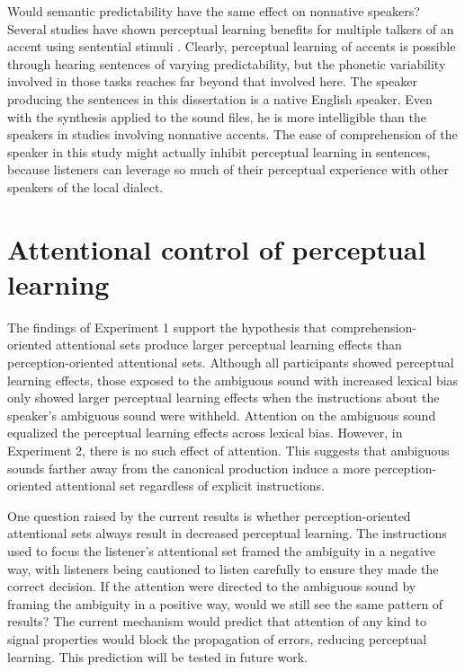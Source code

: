 Would semantic predictability have the same effect on nonnative speakers?
Several studies have shown perceptual learning benefits for multiple talkers of an accent using sentential stimuli \citep[and others]{Bradlow2008}.  
Clearly, perceptual learning of accents is possible through hearing sentences of varying predictability, but the phonetic variability involved in those tasks reaches far beyond that involved here.  
The speaker producing the sentences in this dissertation is a native English speaker.
Even with the synthesis applied to the sound files, he is more intelligible than the speakers in studies involving nonnative accents.
The ease of comprehension of the speaker in this study might actually inhibit perceptual learning in sentences, because listeners can leverage so much of their perceptual experience with other speakers of the local dialect.


\section{Attentional control of perceptual learning}

The findings of Experiment 1 support the hypothesis that comprehension-oriented attentional sets produce larger perceptual learning effects than perception-oriented attentional sets.  
Although all participants showed perceptual learning effects, those exposed to the ambiguous sound with increased lexical bias only showed larger perceptual learning effects when the instructions about the speaker's ambiguous sound were withheld.  
Attention on the ambiguous sound equalized the perceptual learning effects across lexical bias.
However, in Experiment 2, there is no such effect of attention.
This suggests that ambiguous sounds farther away from the canonical production induce a more perception-oriented attentional set regardless of explicit instructions.

One question raised by the current results is whether perception-oriented attentional sets always result in decreased perceptual learning.  
The instructions used to focus the listener's attentional set framed the ambiguity in a negative way, with listeners being cautioned to listen carefully to ensure they made the correct decision.  
If the attention were directed to the ambiguous sound by framing the ambiguity in a positive way, would we still see the same pattern of results?
The current mechanism would predict that attention of any kind to signal properties would block the propagation of errors, reducing perceptual learning.
This prediction will be tested in future work.

